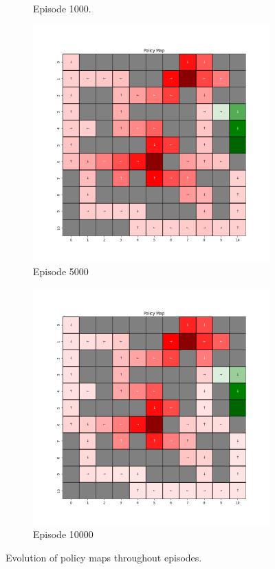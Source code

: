 \documentclass{assignment}
\begin{document}
\begin{figure}[H]
\begin{subfigure}{0.3\textwidth}
    \caption{Episode 1000.}
    \end{subfigure}\hfill
    \begin{subfigure}{0.3\textwidth}
        \includegraphics[width=\textwidth]{figures/policy_td/epsilon_sweep/policy_alpha_0.1_gamma_0.95_epsilon_1.0_iteration_5000.png}
    \caption{Episode 5000}
    \end{subfigure}\hfill
    \begin{subfigure}{0.3\textwidth}
        \includegraphics[width=\textwidth]{figures/policy_td/epsilon_sweep/policy_alpha_0.1_gamma_0.95_epsilon_1.0_iteration_10000.png}
    \caption{Episode 10000}
    \end{subfigure}
    \caption{Evolution of policy maps throughout episodes.}
    \label{fig:epsilon_1.0_td_learning_policy}
\end{figure}
\end{document}
